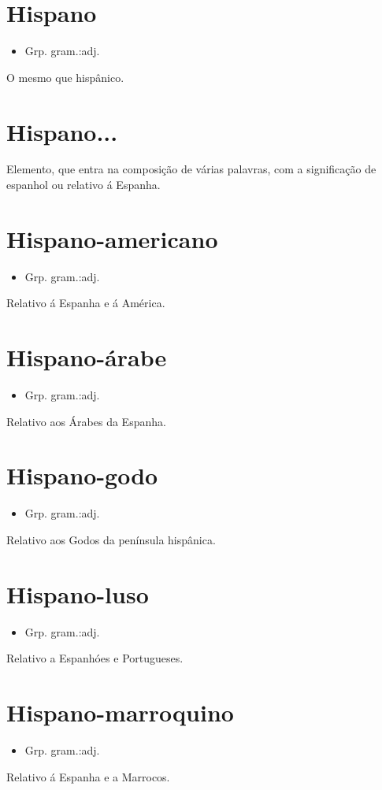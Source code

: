 \documentclass{article}
\begin{document}
\section{Hispano}
\begin{itemize}
\item {Grp. gram.:adj.}
\end{itemize}
O mesmo que \textunderscore hispânico\textunderscore .
\section{Hispano...}
Elemento, que entra na composição de várias palavras, com a significação de espanhol ou relativo á Espanha.
\section{Hispano-americano}
\begin{itemize}
\item {Grp. gram.:adj.}
\end{itemize}
Relativo á Espanha e á América.
\section{Hispano-árabe}
\begin{itemize}
\item {Grp. gram.:adj.}
\end{itemize}
Relativo aos Árabes da Espanha.
\section{Hispano-godo}
\begin{itemize}
\item {Grp. gram.:adj.}
\end{itemize}
Relativo aos Godos da península hispânica.
\section{Hispano-luso}
\begin{itemize}
\item {Grp. gram.:adj.}
\end{itemize}
Relativo a Espanhóes e Portugueses.
\section{Hispano-marroquino}
\begin{itemize}
\item {Grp. gram.:adj.}
\end{itemize}
Relativo á Espanha e a Marrocos.
\end{document}
